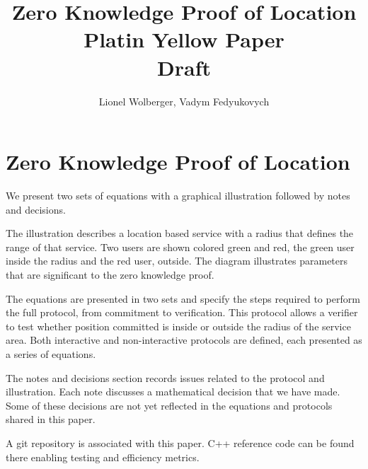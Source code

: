 \documentclass{article}
\begin{document}
\pagecolor{yellow}


\title{
	Zero Knowledge Proof of Location\\
	\small{
	Platin Yellow Paper\\
	Draft}
}
\author{Lionel Wolberger, Vadym Fedyukovych}
\maketitle

\section{Zero Knowledge Proof of Location}

We present two sets of equations with a graphical illustration followed by notes and decisions. 

The illustration describes a location based service with a radius that defines the range of that service.
Two users are shown colored green and red, the green user inside the radius and the red user, outside.
The diagram illustrates parameters that are significant to the zero knowledge proof. 

The equations are presented in two sets and specify the steps required to perform the full protocol, from commitment to verification.
This protocol allows a verifier to test whether position committed is inside or outside the radius of the service area.
Both interactive  and non-interactive protocols are defined, each presented as a series of equations. 

The notes and decisions section records issues related to the protocol and illustration.
Each note discusses a mathematical decision that we have made.
Some of these decisions are not yet reflected in the equations and protocols shared in this paper. 

A git repository is associated with this paper.
C++ reference code can be found there enabling testing and efficiency metrics. 
\end{document}
